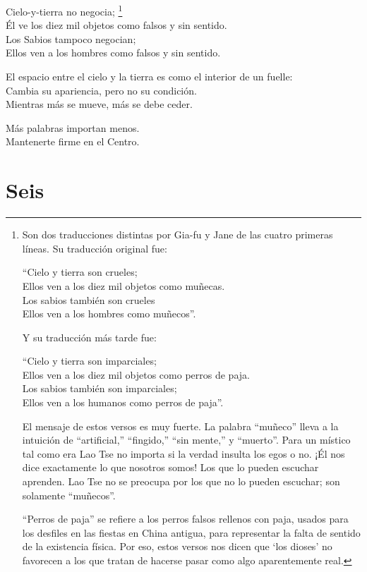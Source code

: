 \documentclass[hidelinks]{memoir}
\begin{document}
	Cielo-y-tierra no negocia;	\footnote{Son dos traducciones distintas por Gia-fu y Jane de las cuatro primeras
		líneas. Su traducción original fue:
		
		``Cielo y tierra son crueles;\\
		Ellos ven a los diez mil objetos como muñecas.\\
		Los sabios también son crueles\\
		Ellos ven a los hombres como muñecos''.
		
		Y su traducción más tarde fue:
		
		``Cielo y tierra son imparciales;\\
		Ellos ven a los diez mil objetos como perros de paja.\\
		Los sabios también son imparciales;\\
		Ellos ven a los humanos como perros de paja''.
	
	El mensaje de estos versos es muy fuerte. La palabra ``muñeco'' lleva a
	la intuición de ``artificial,'' ``fingido,'' ``sin mente,'' y
	``muerto''. Para un místico tal como era Lao Tse no importa si la verdad
	insulta los egos o no. ¡Él nos dice exactamente lo que nosotros somos!
	Los que lo pueden escuchar aprenden. Lao Tse no se preocupa por los que
	no lo pueden escuchar; son solamente ``muñecos''.
	
	``Perros de paja'' se refiere a los perros falsos rellenos con paja,
	usados para los desfiles en las fiestas en China antigua, para
	representar la falta de sentido de la existencia física. Por eso, estos
	versos nos dicen que `los dioses' no favorecen a los que tratan de
	hacerse pasar como algo aparentemente real.	
}\\
	Él ve los diez mil objetos como falsos y sin sentido.\\
	Los Sabios tampoco negocian;\\
	Ellos ven a los hombres como falsos y sin sentido.
	
	El espacio entre el cielo y la tierra es como el interior de un
	fuelle:\\
	Cambia su apariencia, pero no su condición.\\
	Mientras más se mueve, más se debe ceder.
	
	Más palabras importan menos.\\
	Mantenerte firme en el Centro.
	
	\chapter*{Seis}
	
\end{document}
